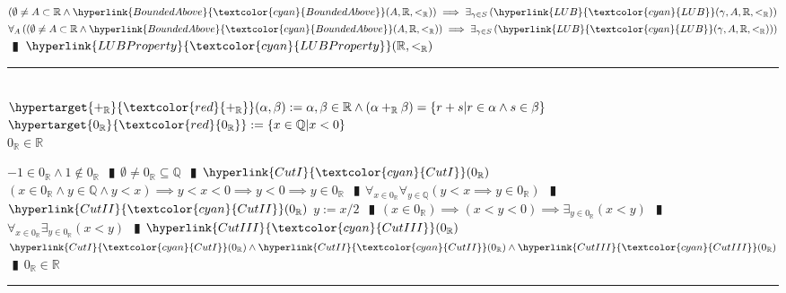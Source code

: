 \documentclass{book}
\newcommand{\df}[1]{\hypertarget{#1}{\textcolor{red}{#1}}}
\newcommand{\wff}[1]{\hypertarget{#1}{\fbox{\textcolor{red}{$#1$}}\phantom{--}}}
\newcommand{\rf}[1]{\hyperlink{#1}{\textcolor{cyan}{#1}}}
\newcommand{\abr}{:=}
\newcommand{\pipe}{$\phantom{(}\vrectangleblack\phantom{)}$}
\newcommand{\pr}[1]{\left(#1\right)}
\begin{document}
\begin{enumerate}
\begin{enumerate}
  \end{enumerate}  
  \lit $\pr{\emptyset \neq A \subset \mathbb{R} \land \rf{BoundedAbove}(A, \mathbb{R}, <_{\mathbb{R}})} \implies \exists_{\gamma \in S}\pr{\rf{LUB}(\gamma, A, \mathbb{R}, <_{\mathbb{R}})}$
  \lit $\forall_{A}\pr{\pr{\emptyset \neq A \subset \mathbb{R} \land \rf{BoundedAbove}(A, \mathbb{R}, <_{\mathbb{R}})} \implies \exists_{\gamma \in S}\pr{\rf{LUB}(\gamma, A, \mathbb{R}, <_{\mathbb{R}})}}$ \pipe $\rf{LUBProperty}(\mathbb{R}, <_{\mathbb{R}})$
\end{enumerate} \vspace{.75mm} \hrule \vspace{.75mm} \ \\

$\df{+_{\mathbb{R}}}(\alpha, \beta) \abr \alpha, \beta \in \mathbb{R} \land (\alpha +_{\mathbb{R}} \beta) = \{r + s | r \in \alpha \land s \in \beta\}$ \\
$\df{0_{\mathbb{R}}} \abr \{x \in \mathbb{Q} | x < 0\}$ \\

\wff{0R} $0_{\mathbb{R}} \in \mathbb{R}$
\begin{enumerate}
  \lit $-1 \in 0_{\mathbb{R}} \land 1 \notin 0_{\mathbb{R}}$ \pipe $\emptyset \neq 0_{\mathbb{R}} \subseteq \mathbb{Q}$ \pipe $\rf{CutI}(0_{\mathbb{R}})$
  \lit $(x \in 0_{\mathbb{R}} \land y \in \mathbb{Q} \land y < x) \implies y < x < 0 \implies y < 0 \implies y \in 0_{\mathbb{R}}$ \pipe $\forall_{x \in 0_{\mathbb{R}}} \forall_{y \in \mathbb{Q}} (y < x \implies y \in 0_{\mathbb{R}})$ \pipe $\rf{CutII}(0_{\mathbb{R}})$
  \lit $y \abr x / 2$ \pipe $(x \in 0_{\mathbb{R}}) \implies (x < y < 0) \implies \exists_{y \in 0_{\mathbb{R}}}(x < y)$ \pipe $\forall_{x \in 0_{\mathbb{R}}} \exists_{y \in 0_{\mathbb{R}}}(x < y)$ \pipe $\rf{CutIII}(0_{\mathbb{R}})$
  \lit $\rf{CutI}(0_{\mathbb{R}}) \land \rf{CutII}(0_{\mathbb{R}}) \land \rf{CutIII}(0_{\mathbb{R}})$ \pipe $0_{\mathbb{R}} \in \mathbb{R}$
\end{enumerate} \vspace{.75mm} \hrule \vspace{.75mm} \ \\
\end{document}
